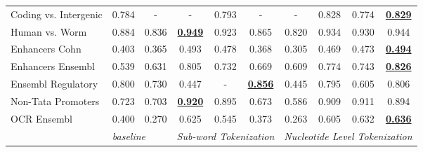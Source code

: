 \begin{table*}[h!]
\begin{center}
\begin{tabular}{l|cc|ccc|cccc}
Coding vs. Intergenic & 0.784 & - & - & 0.793 & - & - & 0.828 & 0.774 & {\ul \textbf{0.829}} \\
Human vs. Worm & 0.884 & 0.836 & {\ul \textbf{0.949}} & 0.923 & 0.865 & 0.820 & 0.934 & 0.930 & 0.944 \\
Enhancers Cohn & 0.403 & 0.365 & 0.493 & 0.478 & 0.368 & 0.305 & 0.469 & 0.473 & {\ul \textbf{0.494}} \\
Enhancers Ensembl & 0.539 & 0.631 & 0.805 & 0.732 & 0.669 & 0.609 & 0.774 & 0.743 & {\ul \textbf{0.826}} \\
Ensembl Regulatory & 0.800 & 0.730 & 0.447 & - & {\ul \textbf{0.856}} & 0.445 & 0.795 & 0.605 & 0.806 \\
Non-Tata Promoters & 0.723 & 0.703 & {\ul \textbf{0.920}} & 0.895 & 0.673 & 0.586 & 0.909 & 0.911 & 0.894 \\
OCR Ensembl & 0.400 & 0.270 & 0.625 & 0.545 & 0.373 & 0.263 & 0.605 & 0.632 & {\ul \textbf{0.636}} \\
\hline
 & \multicolumn{2}{l|}{\textit{baseline}} & \multicolumn{3}{c|}{\textit{Sub-word Tokenization}} & \multicolumn{4}{c}{\textit{Nucleotide Level Tokenization}} \\ \hline
\end{tabular}
\end{center}
\end{table*}
